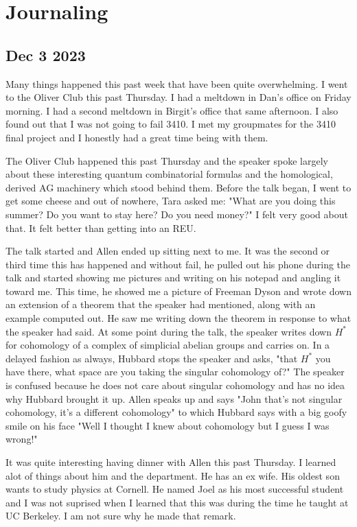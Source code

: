 \documentclass[12pt]{article}
\begin{document}
\section{Journaling}
\subsection{Dec 3 2023}
\doublespacing
Many things happened this past week that have been quite overwhelming. I went to the Oliver Club this past Thursday.
I had a meltdown in Dan's office on Friday morning. I had a second meltdown in Birgit's office that same afternoon.
I also found out that I was not going to fail 3410. I met my groupmates for the 3410 final project and I honestly had a great time being with them.

\hfill

The Oliver Club happened this past Thursday and the speaker spoke largely about these interesting quantum combinatorial formulas and the homological,
derived AG machinery which stood behind them. Before the talk began, I went to get some cheese and out of nowhere, Tara asked me: "What are you doing this summer? Do you want to stay here?
Do you need money?" I felt very good about that. It felt better than getting into an REU.

\hfill

The talk started and Allen ended up sitting next to me. It was the second or third time this has happened and without fail, he pulled out his phone during the talk
and started showing me pictures and writing on his notepad and angling it toward me. This time, he showed me a picture of Freeman Dyson and wrote down an extension of a theorem that 
the speaker had mentioned, along with an example computed out. He saw me writing down the theorem in response to what the speaker had said. At some point during the talk, the speaker 
writes down $H^*$ for cohomology of a complex of simplicial abelian groups and carries on. In a delayed fashion as always, Hubbard stops the speaker and asks, "that $H^*$ you have there, 
what space are you taking the singular cohomology of?" The speaker is confused because he does not care about singular cohomology and has no idea why Hubbard brought it up. Allen speaks up and 
says "John that's not singular cohomology, it's a different cohomology" to which Hubbard says with a big goofy smile on his face "Well I thought I knew about cohomology but I guess I was wrong!"

\hfill

It was quite interesting having dinner with Allen this past Thursday. I learned alot of things about him
and the department. He has an ex wife. His oldest son wants to study physics at Cornell. He named Joel 
as his most successful student and I was not suprised when I learned that this was 
during the time he taught at UC Berkeley. I am not sure why he made that remark.
\end{document}
